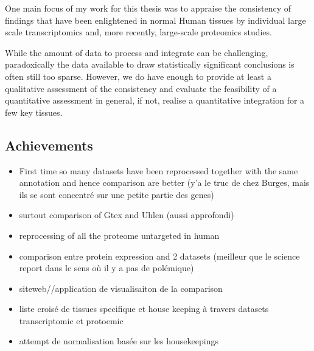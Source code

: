 One main focus of my work for this thesis was to appraise the
consistency of findings that have been enlightened in normal Human tissues by
individual large scale transcriptomics and, more recently, large-scale
proteomics studies.

While the amount of data to process and integrate can be challenging,
paradoxically the data available to draw statistically significant conclusions
is often still too sparse. However, we do have enough to provide at least a
qualitative assessment of the consistency and evaluate the feasibility of a
quantitative assessment in general, if not, realise a quantitative integration
for a few key tissues.

\subsection{Achievements}
\begin{itemize}
    \item First time so many datasets have been reprocessed together with the
        same annotation and hence comparison are better (y'a le truc de chez Burges,
        mais ils se sont concentré sur une petite partie des genes)
    \item surtout comparison of Gtex and Uhlen (aussi approfondi)
    \item reprocessing of all the proteome untargeted in human
    \item comparison entre protein expression and 2 datasets (meilleur que le
        science report dans le sens où il y a pas de polémique)
    \item siteweb//application de visualisaiton de la comparison
    \item liste croisé de tissues specifique et house keeping à travers datasets
        transcriptomic et protoemic
    \item attempt de normalisation basée sur les housekeepings
\end{itemize}

